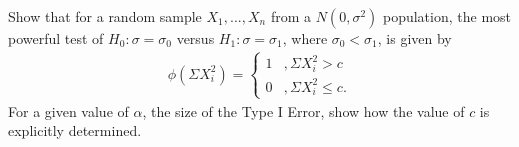 \documentclass[12pt,letterpaper]{exam}
\begin{document}
\begin{questions}
\begin{solution}
\begin{parts}
		\end{parts}
		
	\end{solution}
	
	\clearpage
	\setcounter{question}{15-1}
	
	\question 
	Show that for a random sample $X_1, ..., X_n$ from a $N(0,\sigma^2)$ population, 
	the most powerful test of $H_0: \sigma = \sigma_0$ versus $H_1: \sigma = \sigma_1$, 
	where $\sigma_0 < \sigma_1$, is given by
	\begin{align*}
		\phi\left(\Sigma X_i^2\right) =
		\begin{cases}
			1 &, \Sigma X_i^2 > c \\
			0 &, \Sigma X_i^2 \le c.
		\end{cases}
	\end{align*}
	For a given value of $\alpha$, the size of the Type I Error, show how the value of $c$ is explicitly determined.


\end{questions}
\end{document}
